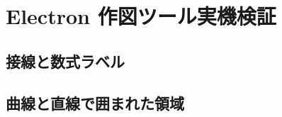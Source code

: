 \documentclass[a4paper]{ltjsarticle}
\begin{document}
\section*{Electron 作図ツール実機検証}

\subsection*{接線と数式ラベル}

\vspace{8mm}

\subsection*{曲線と直線で囲まれた領域}
\end{document}
